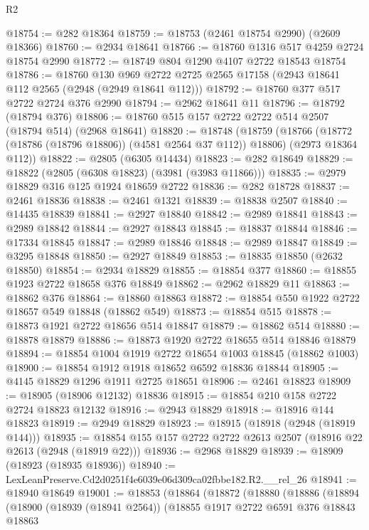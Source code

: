 \begin{lexlean}{R2}
\begin{coremodule}
@18754 := @282 @18364
@18759 := @18753 (@2461 @18754 @2990) (@2609 @18366)
@18760 := @2934 @18641
@18766 := @18760 @1316 @517 @4259 @2724 @18754 @2990
@18772 := @18749 @804 @1290 @4107 @2722 @18543 @18754
@18786 := @18760
    @130
    @969
    @2722
    @2725
    @2565
    @17158
    (@2943 @18641 @112 @2565 (@2948 (@2949 @18641 @112)))
@18792 := @18760 @377 @517 @2722 @2724 @376 @2990
@18794 := @2962 @18641 @11
@18796 := @18792 (@18794 @376)
@18806 := @18760 @515 @157 @2722 @2722 @514 @2507 (@18794 @514) (@2968 @18641)
@18820 := @18748
    (@18759
      (@18766 (@18772 (@18786 (@18796 @18806)) (@4581 @2564 @37 @112)) @18806)
      (@2973 @18364 @112))
@18822 := @2805 (@6305 @14434)
@18823 := @282 @18649
@18829 := @18822 (@2805 (@6308 @18823) (@3981 (@3983 @11866)))
@18835 := @2979 @18829 @316 @125 @1924 @18659 @2722
@18836 := @282 @18728
@18837 := @2461 @18836
@18838 := @2461 @1321
@18839 := @18838 @2507
@18840 := @14435 @18839
@18841 := @2927 @18840
@18842 := @2989 @18841
@18843 := @2989 @18842
@18844 := @2927 @18843
@18845 := @18837 @18844
@18846 := @17334 @18845
@18847 := @2989 @18846
@18848 := @2989 @18847
@18849 := @3295 @18848
@18850 := @2927 @18849
@18853 := @18835 @18850 (@2632 @18850)
@18854 := @2934 @18829
@18855 := @18854 @377
@18860 := @18855 @1923 @2722 @18658 @376 @18849
@18862 := @2962 @18829 @11
@18863 := @18862 @376
@18864 := @18860 @18863
@18872 := @18854 @550 @1922 @2722 @18657 @549 @18848 (@18862 @549)
@18873 := @18854 @515
@18878 := @18873 @1921 @2722 @18656 @514 @18847
@18879 := @18862 @514
@18880 := @18878 @18879
@18886 := @18873 @1920 @2722 @18655 @514 @18846 @18879
@18894 := @18854 @1004 @1919 @2722 @18654 @1003 @18845 (@18862 @1003)
@18900 := @18854 @1912 @1918 @18652 @6592 @18836 @18844
@18905 := @4145 @18829 @1296 @1911 @2725 @18651
@18906 := @2461 @18823
@18909 := @18905 (@18906 @12132) @18836
@18915 := @18854 @210 @158 @2722 @2724 @18823 @12132
@18916 := @2943 @18829
@18918 := @18916 @144 @18823
@18919 := @2949 @18829
@18923 := @18915 (@18918 (@2948 (@18919 @144)))
@18935 := @18854 @155 @157 @2722 @2722 @2613 @2507 (@18916 @22 @2613 (@2948 (@18919 @22)))
@18936 := @2968 @18829
@18939 := @18909 (@18923 (@18935 @18936))
@18940 := LexLeanPreserve.Cd2d0251f4e6039e06d309ca02fbbe182.R2.__rel_26
@18941 := @18940 @18649
@19001 := @18853
    (@18864
      (@18872
        (@18880
          (@18886
            (@18894
              (@18900
                (@18939 (@18941 @2564))
                (@18855
                  @1917
                  @2722
                  @6591
                  @376
                  @18843
                  @18863

\end{coremodule}
\end{lexlean}
